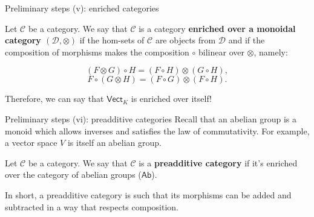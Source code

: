 \documentclass{beamer}
\newcommand{\cat}[1]{\mathsf{#1}}
\begin{document}
\begin{frame}{Preliminary steps (v): enriched categories}
    \begin{definition}
        Let $\mathcal{C}$ be a category. We say that $\mathcal{C}$
        is a category \textbf{enriched over a monoidal category $(\mathcal{D}, \otimes)$}
        if the hom-sets of $\mathcal{C}$ are objects from
        $\mathcal{D}$ and if the composition of morphisms makes
        the composition $\circ$ bilinear over $\otimes$, namely:

        \[
            (F \otimes G) \circ H = (F \circ H) \otimes (G \circ H),
        \]
        \[
            F \circ (G \otimes H) = (F \circ G) \otimes (F \circ H).
        \]
    \end{definition}

    Therefore, we can say that $\cat{Vect}_K$ is enriched over itself!
\end{frame}

\begin{frame}{Preliminary steps (vi): preadditive categories}
    Recall that an abelian group is a monoid which allows inverses
    and satisfies the law of commutativity. For example, a vector
    space $V$ is itself an abelian group. \medskip

    \begin{definition}
        Let $\mathcal{C}$ be a category. We say that $\mathcal{C}$
        is a \textbf{preadditive category} if it's enriched
        over the category of abelian groups ($\cat{Ab}$).
    \end{definition} \smallskip

    In short, a preadditive category is such that its morphisms can
    be added and subtracted in a way that respects composition.
\end{frame}

%    
\end{document}
